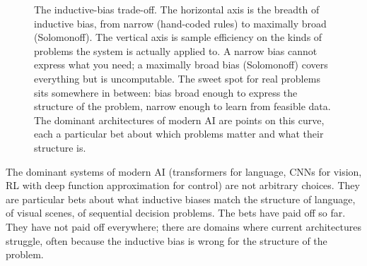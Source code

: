 \begin{figure}[h]
\centering
{}
\caption{The inductive-bias trade-off. The horizontal axis is the breadth of inductive bias, from narrow (hand-coded rules) to maximally broad (Solomonoff). The vertical axis is sample efficiency on the kinds of problems the system is actually applied to. A narrow bias cannot express what you need; a maximally broad bias (Solomonoff) covers everything but is uncomputable. The sweet spot for real problems sits somewhere in between: bias broad enough to express the structure of the problem, narrow enough to learn from feasible data. The dominant architectures of modern AI are points on this curve, each a particular bet about which problems matter and what their structure is.}
\label{fig:bias-tradeoff}
\end{figure}

The dominant systems of modern AI (transformers for language, CNNs for vision, RL with deep function approximation for control) are not arbitrary choices. They are particular bets about what inductive biases match the structure of language, of visual scenes, of sequential decision problems. The bets have paid off so far. They have not paid off everywhere; there are domains where current architectures struggle, often because the inductive bias is wrong for the structure of the problem.

